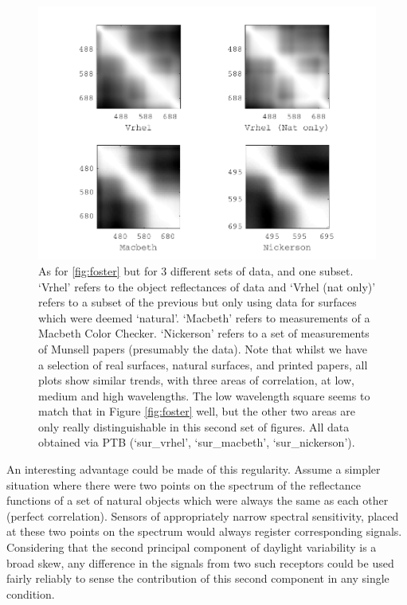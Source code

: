 \begin{figure}[htbp]
 \includegraphics[max width=\textwidth]{figs/comp/nat_cor/others.pdf}
 \caption{As for \ref{fig:foster} but for 3 different sets of data, and one subset. `Vrhel' refers to the object reflectances of \citet{vrhel_measurement_1994} data and `Vrhel (nat only)' refers to a subset of the previous but only using data for surfaces which were deemed `natural'. `Macbeth' refers to measurements of a Macbeth Color Checker. `Nickerson' refers to a set of measurements of Munsell papers (presumably the \citet{kelly_tristimulus_1943} data). Note that whilst we have a selection of real surfaces, natural surfaces, and printed papers, all plots show similar trends, with three areas of correlation, at low, medium and high wavelengths. The low wavelength square seems to match that in Figure \ref{fig:foster} well, but the other two areas are only really distinguishable in this second set of figures. All data obtained via \gls{PTB} (`sur\_vrhel', `sur\_macbeth', `sur\_nickerson').}
 \label{fig:others}
\end{figure} 

An interesting advantage could be made of this regularity. Assume a simpler situation where there were two points on the spectrum of the reflectance functions of a set of natural objects which were always the same as each other (perfect correlation). Sensors of appropriately narrow spectral sensitivity, placed at these two points on the spectrum would always register corresponding signals. Considering that the second principal component of daylight variability is a broad skew, any difference in the signals from two such receptors could be used fairly reliably to sense the contribution of this second component in any single condition. 

